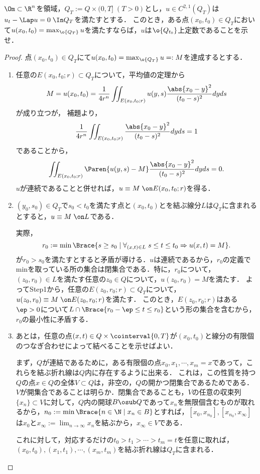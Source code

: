 \documentclass[uplatex,dvipdfmx]{jsarticle}
\begin{document}
\begin{problem}[強最大値原理]
    $\Om\subset\R^n$を領域，$Q_T:=Q\times{(0,T]}\;(T>0)$とし，$u\in C^{2,1}(Q_T)$は$u_t-\Lap u=0\;\In Q_T$を満たすとする．
    このとき，ある点$(x_0,t_0)\in Q_T$において$u(x_0,t_0)=\max_{\o{Q_T}}u$を満たすならば，$u$は$\o{Q_{t_0}}$上定数であることを示せ．
\end{problem}
\begin{proof}
    点$(x_0,t_0)\in Q_T$にて$u(x_0,t_0)=\max_{\o{Q_T}}u=:M$を達成するとする．
    \begin{enumerate}[{Step}1]
        \item 任意の$E(x_0,t_0;r)\subset Q_T$について，平均値の定理から
        \[M=u(x_0,t_0)=\frac{1}{4r^n}\iint_{E(x_0,t_0;r)}u(y,s)\frac{\abs{x_0-y}^2}{(t_0-s)^2}dyds\]
        が成り立つが，
        補題より，
        \[\frac{1}{4r^n}\iint_{E(x_0,t_0;r)}\frac{\abs{x_0-y}^2}{(t_0-s)^2}dyds=1\]
        であることから，
        \[\iint_{E(x_0,t_0;r)}\Paren{u(y,s)-M}\frac{\abs{x_0-y}^2}{(t_0-s)^2}dyds=0.\]
        $u$が連続であることと併せれば，$u\equiv M\;\on E(x_0,t_0;r)$を得る．
        \item $(y_0,s_0)\in Q_T$で$s_0<t_0$を満たす点と$(x_0,t_0)$とを結ぶ線分$L$は$Q_T$に含まれるとすると，$u\equiv M\;\on L$である．
        
        実際，
        \[r_0:=\min\Brace{s\ge s_0\mid \forall_{(x,t)\in L}\;s\le t\le t_0\Rightarrow u(x,t)=M}.\]
        が$r_0>s_0$を満たすとすると矛盾が導ける．$u$は連続であるから，$r_0$の定義でminを取っている所の集合は閉集合である．特に，$r_0$について，
        $(z_0,r_0)\in L$を満たす任意の$z_0\in Q$について，$u(z_0,r_0)=M$を満たす．
        よってStep1から，任意の$E(z_0,r_0;r)\subset Q_T$について，$u(z_0,r_0)\equiv M\;\on E(z_0,r_0;r)$を満たす．
        このとき，$E(z_0,r_0;r)$はある$\ep>0$について$L\cap\Brace{r_0-\ep\le t\le r_0}$という形の集合を含むから，$r_0$の最小性に矛盾する．
        \item あとは，任意の点$(x,t)\in Q\times\cointerval{0,T}$が$(x_0,t_0)$と線分の有限個のつなぎ合わせによって結べることを示せばよい．
        
        まず，$Q$が連結であるために，ある有限個の点$x_0,x_1,\cdots,x_m=x$であって，これらを結ぶ折れ線は$Q$内に存在するように出来る．
        これは，この性質を持つ$Q$の点$x\in Q$の全体$V\subset Q$は，非空の，$Q$の開かつ閉集合であるためである．
        $V$が開集合であることは明らか．閉集合であることも，$V$の任意の収束列$\{x_n\}\subset V$に対して，$Q$内の開球$B\osub Q$であって$x_n$を無限個含むものが取れるから，$n_0:=\min\Brace{n\in\N\mid x_n\in B}$とすれば，$[x_0,x_{n_0}],[x_{n_0},x_\infty]$は$x_0$と$x_\infty:=\lim_{n\to\infty}x_n$を結ぶから，$x_\infty\in V$である．

        これに対して，対応するだけの$t_0>t_1>\cdots>t_m=t$を任意に取れば，$(x_0,t_0),(x_1,t_1),\cdots,(x_m,t_m)$を結ぶ折れ線は$Q_T$に含まれる．
    \end{enumerate}
\end{proof}
\end{document}

